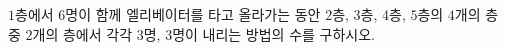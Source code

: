 $1$층에서 $6$명이 함께 엘리베이터를 타고 올라가는 동안 $2$층, $3$층, $4$층, $5$층의 $4$개의 층 중 $2$개의 층에서 각각 $3$명, $3$명이 내리는 방법의 수를 구하시오. 
